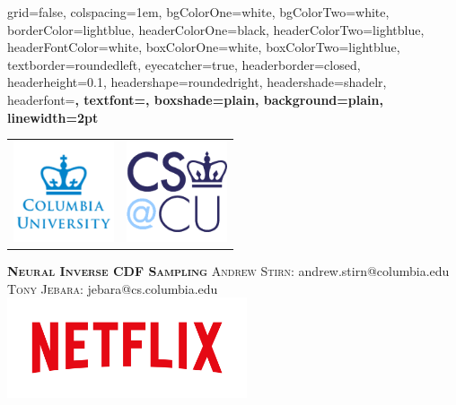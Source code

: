 \documentclass[landscape,paperwidth=40in,paperheight=30in, margin=1in]{baposter}
\begin{document}


\begin{poster}%
  {
  grid=false,
  colspacing=1em,
  bgColorOne=white,
  bgColorTwo=white,
  borderColor=lightblue,
  headerColorOne=black,
  headerColorTwo=lightblue,
  headerFontColor=white,
  boxColorOne=white,
  boxColorTwo=lightblue,
  textborder=roundedleft,
  eyecatcher=true,
  headerborder=closed,
  headerheight=0.1\textheight,
  headershape=roundedright,
  headershade=shadelr,
  headerfont=\Large\bf\textsc, %
  textfont={\setlength{\parindent}{1.5em}},
  boxshade=plain,
  background=plain,
  linewidth=2pt
  }
  {
    \begin{tabular}{cc}
         \includegraphics[height=8.0em]{images/columbia_university.png}
         &
         \includegraphics[height=8.0em]{images/cs_cu.png}
    \end{tabular}
    } 
  {\bf\textsc{Neural Inverse CDF Sampling}\vspace{0.5em}}
  {\textsc{Andrew Stirn: }andrew.stirn@columbia.edu\\
   \textsc{Tony Jebara: }jebara@cs.columbia.edu}
  {%
    \includegraphics[height=8.0em]{images/Netflix_Logo_RGB.png}
  }


\end{poster}
\end{document}
